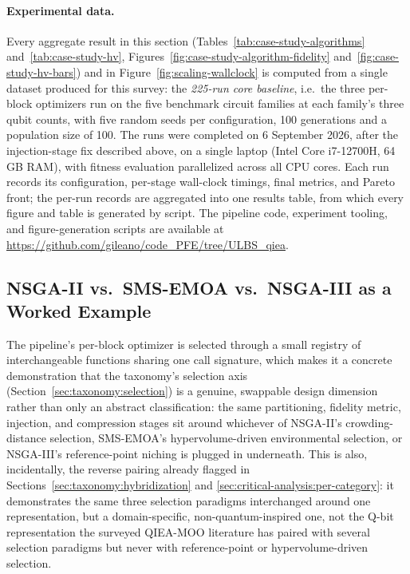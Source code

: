 \paragraph{Experimental data.}
\label{sec:case-study:data}
Every aggregate result in this section (Tables~\ref{tab:case-study-algorithms}
and~\ref{tab:case-study-hv}, Figures~\ref{fig:case-study-algorithm-fidelity}
and~\ref{fig:case-study-hv-bars})
and in Figure~\ref{fig:scaling-wallclock} is computed from a single
dataset produced for this survey: the \emph{225-run core baseline}, i.e.\
the three per-block optimizers run on the five benchmark circuit
families at each family's three qubit counts, with five random seeds
per configuration, 100 generations and a population size of 100. The
runs were completed on 6 September 2026, after the injection-stage
fix described above, on a single laptop (Intel Core i7-12700H, 64\,GB
RAM), with fitness evaluation parallelized across all CPU cores. Each
run records its configuration, per-stage wall-clock timings, final
metrics, and Pareto front; the per-run records are aggregated into one
results table, from which every figure and table is generated by
script. The pipeline code, experiment tooling, and figure-generation
scripts are available at
\url{https://github.com/gileano/code_PFE/tree/ULBS_qiea}.

\subsection{NSGA-II vs.\ SMS-EMOA vs.\ NSGA-III as a Worked Example}
\label{sec:case-study:algorithms}

The pipeline's per-block optimizer is selected through a small registry
of interchangeable functions sharing one call signature, which makes it
a concrete demonstration that the taxonomy's selection axis
(Section~\ref{sec:taxonomy:selection}) is a genuine, swappable design
dimension rather than only an abstract classification: the same
partitioning, fidelity metric, injection, and compression stages sit
around whichever of NSGA-II's crowding-distance selection, SMS-EMOA's
hypervolume-driven environmental selection, or NSGA-III's reference-point
niching is plugged in underneath. This is also, incidentally, the
reverse pairing already flagged in
Sections~\ref{sec:taxonomy:hybridization} and
\ref{sec:critical-analysis:per-category}: it demonstrates the same
three selection paradigms interchanged around one representation, but a
domain-specific, non-quantum-inspired one, not the Q-bit representation
the surveyed QIEA-MOO literature has paired with several selection
paradigms but never with reference-point or hypervolume-driven
selection.

